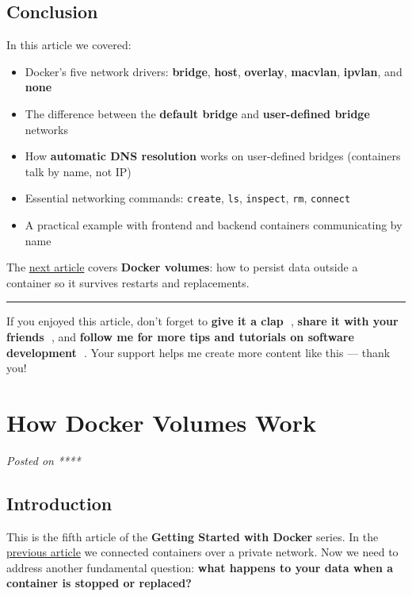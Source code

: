 \documentclass[11pt,american,a4paper,openany]{book}
\providecommand{\tightlist}{%
  \setlength{\itemsep}{2pt}\setlength{\parskip}{0pt}}
\begin{document}
\subsection{Conclusion}\label{conclusion-3}

In this article we covered:

\begin{itemize}
\tightlist
\item
  Docker's five network drivers: \textbf{bridge}, \textbf{host},
  \textbf{overlay}, \textbf{macvlan}, \textbf{ipvlan}, and \textbf{none}
\item
  The difference between the \textbf{default bridge} and
  \textbf{user-defined bridge} networks
\item
  How \textbf{automatic DNS resolution} works on user-defined bridges
  (containers talk by name, not IP)
\item
  Essential networking commands: \texttt{create}, \texttt{ls},
  \texttt{inspect}, \texttt{rm}, \texttt{connect}
\item
  A practical example with frontend and backend containers communicating
  by name
\end{itemize}

The
\href{/Users/sasadangelo/github.com/sasadangelo/code4projects/how-docker-volumes-work/}{next
article} covers \textbf{Docker volumes}: how to persist data outside a
container so it survives restarts and replacements.

\begin{center}\rule{0.5\linewidth}{0.5pt}\end{center}

If you enjoyed this article, don't forget to \textbf{give it a clap 👏},
\textbf{share it with your friends 🔗}, and \textbf{follow me for more
tips and tutorials on software development 📘}. Your support helps me
create more content like this --- thank you! 🙌

\section{How Docker Volumes Work}\label{how-docker-volumes-work}

\emph{Posted on ****}

\subsection{Introduction}\label{introduction-4}

This is the fifth article of the \textbf{Getting Started with Docker}
series. In the
\href{/Users/sasadangelo/github.com/sasadangelo/code4projects/how-docker-networking-works-2025/}{previous
article} we connected containers over a private network. Now we need to
address another fundamental question: \textbf{what happens to your data
when a container is stopped or replaced?}
\end{document}
